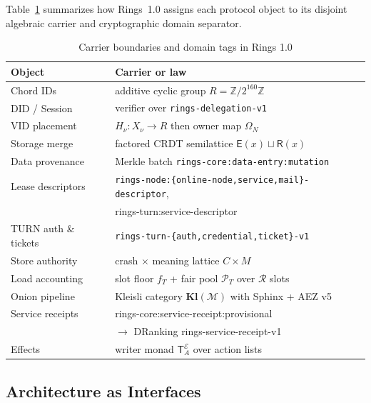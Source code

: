 \documentclass[journal]{IEEEtran}
\DeclareRobustCommand{\code}[1]{{\ttfamily\renewcommand{\_}{\textunderscore\allowbreak}#1}}
\begin{document}
Table~\ref{carrier-table} summarizes how Rings~1.0 assigns each protocol object to its disjoint algebraic carrier and cryptographic domain separator.

\begin{table}[htbp]
\centering
\caption{Carrier boundaries and domain tags in Rings 1.0}
\label{carrier-table}
\scriptsize
\setlength{\tabcolsep}{3pt}
\begin{tabular}{@{}p{2.1cm}>{\raggedright\arraybackslash}p{5.5cm}@{}}
\toprule
Object & Carrier or law \\ \midrule
Chord IDs & additive cyclic group $R=\mathbb{Z}/2^{160}\mathbb{Z}$ \\
DID / Session & verifier over \texttt{rings-delegation-v1} \\
VID placement & $H_\nu:X_\nu\to R$ then owner map $\Omega_N$ \\
Storage merge & factored CRDT semilattice $\mathsf{E}(x)\sqcup\mathsf{R}(x)$ \\
Data provenance & Merkle batch \texttt{rings-core:\allowbreak data-entry:\allowbreak mutation} \\
Lease descriptors & \texttt{rings-node:\allowbreak\{online-node,\allowbreak service,\allowbreak mail\}-descriptor},\\ & \code{rings-turn:service-descriptor} \\
TURN auth \& tickets & \texttt{rings-turn-\allowbreak\{auth,\allowbreak credential,\allowbreak ticket\}-v1} \\
Store authority & crash $\times$ meaning lattice $C\times M$ \\
Load accounting & slot floor $f_T$ + fair pool $\mathcal{P}_T$ over $\mathcal{R}$ slots \\
Onion pipeline & Kleisli category $\mathbf{Kl}(\mathcal{M})$ with Sphinx + AEZ v5 \\
Service receipts & \code{rings-core:\allowbreak service-receipt:\allowbreak provisional} \\ & $\to$ DRanking \code{rings-service-receipt-v1} \\
Effects & writer monad $\mathsf{T}^{\mathcal{E}}_A$ over action lists \\
\bottomrule
\end{tabular}
\normalsize
\end{table}

\subsection{Architecture as Interfaces}
\end{document}
